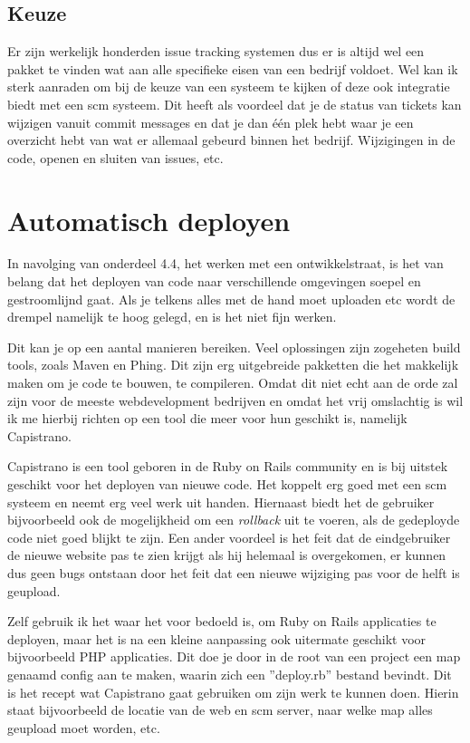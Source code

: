 \subsection{Keuze}

Er zijn werkelijk honderden issue tracking systemen\cite{issuetracking} dus er is altijd wel een pakket te vinden wat aan alle specifieke eisen van een bedrijf voldoet. Wel kan ik sterk aanraden om bij de keuze van een systeem te kijken of deze ook integratie biedt met een {\sc scm} systeem. Dit heeft als voordeel dat je de status van tickets kan wijzigen vanuit commit messages en dat je dan \'{e}\'{e}n plek hebt waar je een overzicht hebt van wat er allemaal gebeurd binnen het bedrijf. Wijzigingen in de code, openen en sluiten van issues, etc.

\section{Automatisch deployen}

In navolging van onderdeel 4.4, het werken met een ontwikkelstraat, is het van belang dat het deployen van code naar verschillende omgevingen soepel en gestroomlijnd gaat. Als je telkens alles met de hand moet uploaden etc wordt de drempel namelijk te hoog gelegd, en is het niet fijn werken.

Dit kan je op een aantal manieren bereiken. Veel oplossingen zijn zogeheten build tools, zoals Maven\cite{maven} en Phing\cite{phing}. Dit zijn erg uitgebreide pakketten die het makkelijk maken om je code te bouwen, te compileren. Omdat dit niet echt aan de orde zal zijn voor de meeste webdevelopment bedrijven en omdat het vrij omslachtig is wil ik me hierbij richten op een tool die meer voor hun geschikt is, namelijk Capistrano\cite{capistrano}.

Capistrano is een tool geboren in de Ruby on Rails community en is bij uitstek geschikt voor het deployen van nieuwe code. Het koppelt erg goed met een {\sc scm} systeem en neemt erg veel werk uit handen. Hiernaast biedt het de gebruiker bijvoorbeeld ook de mogelijkheid om een \emph{rollback} uit te voeren, als de gedeployde code niet goed blijkt te zijn. Een ander voordeel is het feit dat de eindgebruiker de nieuwe website pas te zien krijgt als hij helemaal is overgekomen, er kunnen dus geen bugs ontstaan door het feit dat een nieuwe wijziging pas voor de helft is geupload.

Zelf gebruik ik het waar het voor bedoeld is, om Ruby on Rails applicaties te deployen, maar het is na een kleine aanpassing ook uitermate geschikt voor bijvoorbeeld PHP applicaties. Dit doe je door in de root van een project een map genaamd config aan te maken, waarin zich een ''deploy.rb'' bestand bevindt. Dit is het recept wat Capistrano gaat gebruiken om zijn werk te kunnen doen. Hierin staat bijvoorbeeld de locatie van de web en {\sc scm} server, naar welke map alles geupload moet worden, etc.

